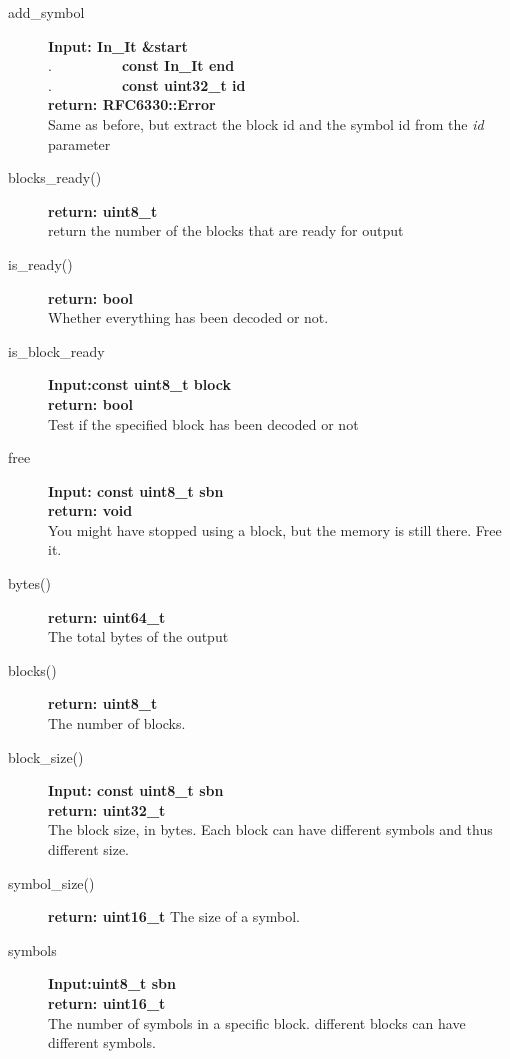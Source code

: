\documentclass[11pt,a4paper]{refart}
\begin{document}
\begin{description}
\item[add\_symbol]\textbf{Input: In\_It \&start}\\
.\ \ \ \ \ \ \ \ \ \ \textbf{const In\_It end}\\
.\ \ \ \ \ \ \ \ \ \ \textbf{const uint32\_t id}\\
\textbf{return: RFC6330::Error}\\
Same as before, but extract the block id and the symbol id from the \textit{id} parameter

\item[blocks\_ready()]\textbf{return: uint8\_t}\\
return the number of the blocks that are ready for output
\item[is\_ready()]\textbf{return: bool}\\
Whether everything has been decoded or not.
\item[is\_block\_ready]\textbf{Input:const uint8\_t block}\\
\textbf{return: bool}\\
Test if the specified block has been decoded or not


\item[free]\textbf{Input: const uint8\_t sbn}\\
\textbf{return: void}\\
You might have stopped using a block, but the memory is still there. Free it.

\item[bytes()] \textbf{return: uint64\_t}\\
The total bytes of the output
\item[blocks()] \textbf{return: uint8\_t}\\
The number of blocks.

\item[block\_size()] \textbf{Input: const uint8\_t sbn}\\
\textbf{return: uint32\_t}\\
The block size, in bytes. Each block can have different symbols and thus different size.

\item[symbol\_size()] \textbf{return: uint16\_t} The size of a symbol.

\item[symbols] \textbf{Input:uint8\_t sbn}\\
\textbf{return: uint16\_t}\\
The number of symbols in a specific block. different blocks can have different symbols.
\end{description}
\newpage
\end{document}
